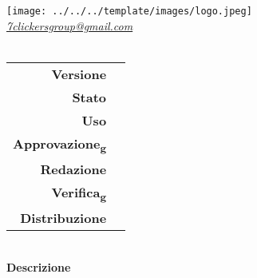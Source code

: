 \thispagestyle{empty}
\renewcommand{\arraystretch}{1.3}

\begin{titlepage}
	\begin{center}
		
	\texttt{[image: ../../../template/images/logo.jpeg]}
	\\[1cm]
	\href{mailto:7clickersgroup@gmail.com}		      	
	{\large{\textit{7clickersgroup@gmail.com} } }\\[2.5cm]
	\Huge \textbf{\doctitle} \\[1cm]
	 \large
			 \begin{tabular}{r|l}
                        \textbf{Versione} & \rev{} \\
                        \textbf{Stato} & \stato{} \\
                        \textbf{Uso} & \uso{} \\                         
                        \textbf{Approvazione\textsubscript{g}} & \approv{} \\                      
                        \textbf{Redazione} & \red{} \\ 
                        \textbf{Verifica\textsubscript{g}} &  \ver{} \\                         
                        \textbf{Distribuzione} & \parbox[t]{5cm}{ \dest{} }
                \end{tabular} 
                \\[3.3cm]
                \large \textbf{Descrizione} \\ \describedoc{} 
     \end{center}
\end{titlepage}